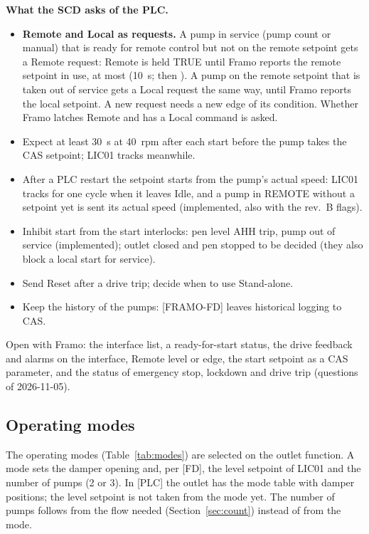 \documentclass[11pt,a4paper]{article}
\begin{document}
\textbf{What the SCD asks of the PLC.}
\begin{itemize}[nosep]
  \item \textbf{Remote and Local as requests.} A pump in service (pump count or manual) that is ready for
        remote control but not on the remote setpoint gets a Remote request: Remote is held TRUE until Framo
        reports the remote setpoint in use, at most  (10~s; then ).
        A pump on the remote setpoint that is taken out of service gets a Local request the same way, until
        Framo reports the local setpoint. A new request needs a new edge of its condition. Whether Framo
        latches Remote and has a Local command is asked.
  \item Expect at least 30~s at 40~rpm after each start before the pump takes the CAS setpoint; LIC01 tracks meanwhile.
  \item After a PLC restart the setpoint starts from the pump's actual speed: LIC01 tracks for one cycle
        when it leaves Idle, and a pump in REMOTE without a setpoint yet is sent its actual speed
        (implemented, also with the rev.~B flags).
  \item Inhibit start from the start interlocks: pen level AHH trip, pump out of service (implemented);
        outlet closed and pen stopped to be decided (they also block a local start for service).
  \item Send Reset after a drive trip; decide when to use Stand-alone.
  \item Keep the history of the pumps: [FRAMO-FD] leaves historical logging to CAS.
\end{itemize}
Open with Framo: the interface list, a ready-for-start status, the drive feedback and alarms on the
interface, Remote level or edge, the start setpoint as a CAS parameter, and the status of emergency stop,
lockdown and drive trip (questions of 2026-11-05).

\subsection{Operating modes}
The operating modes (Table~\ref{tab:modes}) are selected on the outlet function. A mode sets the
damper opening and, per [FD], the level setpoint of LIC01 and the number of pumps (2 or 3). In [PLC]
the outlet has the mode table with damper positions; the level setpoint is not taken from the mode
yet. The number of pumps follows from the flow needed (Section~\ref{sec:count}) instead of from
the mode.
\end{document}
